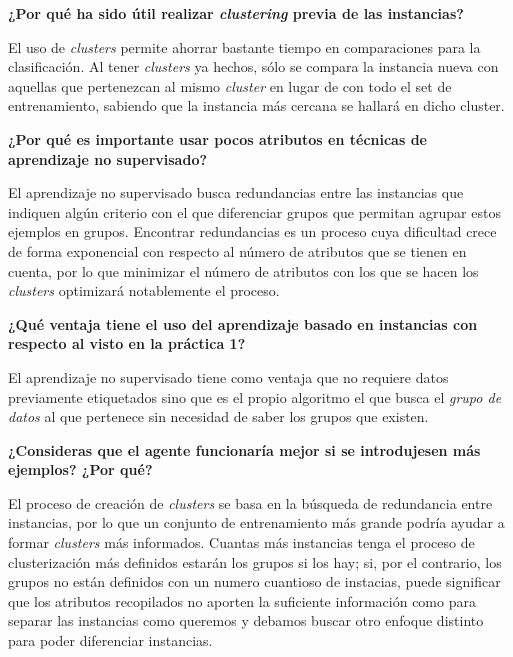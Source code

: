 \documentclass[12pt]{article}
\begin{document}
\vspace{0.5cm}
\begin{center}
    \textbf{¿Por qué ha sido útil realizar \textit{clustering} previa de las instancias?}
\end{center}
\vspace{0.5cm}

El uso de \textit{clusters} permite ahorrar bastante tiempo en comparaciones para la clasificación. Al tener \textit{clusters} ya hechos, sólo se compara la instancia nueva con aquellas que pertenezcan al mismo \textit{cluster} en lugar de con todo el set de entrenamiento, sabiendo que la instancia más cercana se hallará en dicho cluster.

\vspace{0.5cm}
\begin{center}
    \textbf{¿Por qué es importante usar pocos atributos en técnicas de aprendizaje no supervisado?}
\end{center}
\vspace{0.5cm}

El aprendizaje no supervisado busca redundancias entre las instancias que indiquen algún criterio con el que diferenciar grupos que permitan agrupar estos ejemplos en grupos. Encontrar redundancias es un proceso cuya dificultad crece de forma exponencial con respecto al número de atributos que se tienen en cuenta, por lo que minimizar el número de atributos con los que se hacen los \textit{clusters} optimizará notablemente el proceso.

\vspace{0.5cm}
\begin{center}
    \textbf{¿Qué ventaja tiene el uso del aprendizaje basado en instancias con respecto al visto en la práctica 1?}
\end{center}
\vspace{0.5cm}

El aprendizaje no supervisado tiene como ventaja que no requiere datos previamente etiquetados sino que es el propio algoritmo el que busca el \textit{grupo de datos} al que pertenece sin necesidad de saber los grupos que existen.

\vspace{0.5cm}
\begin{center}
    \textbf{¿Consideras que el agente funcionaría mejor si se introdujesen más ejemplos? ¿Por qué?}
\end{center}
\vspace{0.5cm}

El proceso de creación de \textit{clusters} se basa en la búsqueda de redundancia entre instancias, por lo que un conjunto de entrenamiento más grande podría ayudar a formar \textit{clusters} más informados. Cuantas más instancias tenga el proceso de clusterización más definidos estarán los grupos si los hay; si, por el contrario, los grupos no están definidos con un numero cuantioso de instacias, puede significar que los atributos recopilados no aporten la suficiente información como para separar las instancias como queremos y debamos buscar otro enfoque distinto para poder diferenciar instancias.
\end{document}
